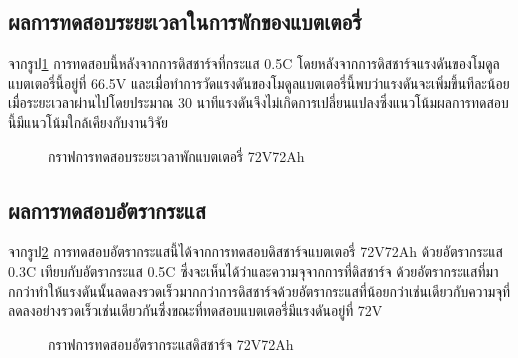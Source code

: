 \subsection{ผลการทดสอบระยะเวลาในการพักของแบตเตอรี่}
จากรูป\ref{fig:Rest_Test} การทดสอบนี้หลังจากการดิสชาร์จที่กระแส 0.5C โดยหลังจากการดิสชาร์จแรงดันของโมดูลแบตเตอรี่นี้อยู่ที่ 66.5V 
และเมื่อทำการวัดแรงดันของโมดูลแบตเตอรี่นี้พบว่าแรงดันจะเพิ่มขึ้นทีละน้อยเมื่อระยะเวลาผ่านไปโดยประมาณ 30 นาทีแรงดันจึงไม่เกิดการเปลี่ยนแปลงซึ่งแนวโน้มผลการทดสอบนี้มีแนวโน้มใกล้เคียงกับงานวิจัย\cite{9209879}
\begin{center}
	\begin{figure}[H]
		\centering
		\captionsetup{justification=centering,margin=2cm}
		\caption{กราฟการทดสอบระยะเวลาพักแบตเตอรี่ 72V72Ah}
		\label{fig:Rest_Test}
	\end{figure}
\end{center}
\pagebreak
\subsection{ผลการทดสอบอัตรากระแส}
จากรูป\ref{fig:C_rate_Test} การทดสอบอัตรากระแสนี้ได้จากการทดสอบดิสชาร์จแบตเตอรี่ 72V72Ah ด้วยอัตรากระแส 0.3C เทียบกับอัตรากระแส 0.5C ซึ่งจะเห็นได้ว่าและความจุจากการที่ดิสชาร์จ
ด้วยอัตรากระแสที่มากกว่าทำให้แรงดันนั้นลดลงรวดเร็วมากกว่าการดิสชาร์จด้วยอัตรากระแสที่น้อยกว่าเช่นเดียวกับความจุที่ลดลงอย่างรวดเร็วเช่นเดียวกันซึ่งขณะที่ทดสอบแบตเตอรี่มีแรงดันอยู่ที่ 72V
\begin{center}
	\begin{figure}[H]
		\centering
		\captionsetup{justification=centering,margin=2cm}
		\caption{กราฟการทดสอบอัตรากระแสดิสชาร์จ 72V72Ah}
		\label{fig:C_rate_Test}
	\end{figure}
\end{center}